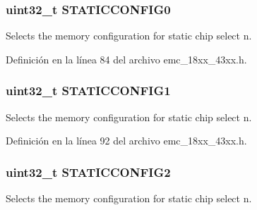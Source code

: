 \subsubsection[{\texorpdfstring{S\+T\+A\+T\+I\+C\+C\+O\+N\+F\+I\+G0}{STATICCONFIG0}}]{ uint32\+\_\+t S\+T\+A\+T\+I\+C\+C\+O\+N\+F\+I\+G0}\hypertarget{struct_l_p_c___e_m_c___t_a328215677a321e28065a2c5664dff4d9}{}\label{struct_l_p_c___e_m_c___t_a328215677a321e28065a2c5664dff4d9}
Selects the memory configuration for static chip select n. 

Definición en la línea 84 del archivo emc\+\_\+18xx\+\_\+43xx.\+h.

\subsubsection[{\texorpdfstring{S\+T\+A\+T\+I\+C\+C\+O\+N\+F\+I\+G1}{STATICCONFIG1}}]{ uint32\+\_\+t S\+T\+A\+T\+I\+C\+C\+O\+N\+F\+I\+G1}\hypertarget{struct_l_p_c___e_m_c___t_a3057f5d4903f872f54bd86fac20724c0}{}\label{struct_l_p_c___e_m_c___t_a3057f5d4903f872f54bd86fac20724c0}
Selects the memory configuration for static chip select n. 

Definición en la línea 92 del archivo emc\+\_\+18xx\+\_\+43xx.\+h.

\subsubsection[{\texorpdfstring{S\+T\+A\+T\+I\+C\+C\+O\+N\+F\+I\+G2}{STATICCONFIG2}}]{ uint32\+\_\+t S\+T\+A\+T\+I\+C\+C\+O\+N\+F\+I\+G2}\hypertarget{struct_l_p_c___e_m_c___t_ae4fdc91db6c877303a5fe30af23b60cf}{}\label{struct_l_p_c___e_m_c___t_ae4fdc91db6c877303a5fe30af23b60cf}
Selects the memory configuration for static chip select n. 

